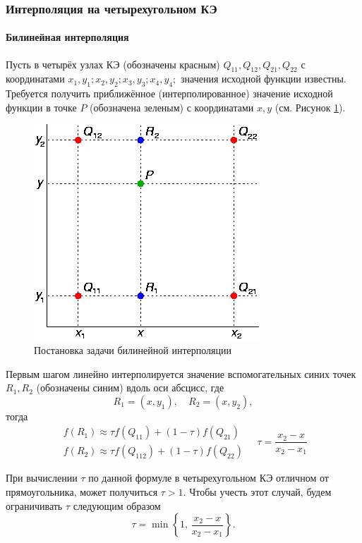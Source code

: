 \subsubsection{Интерполяция на четырехугольном КЭ}
\paragraph{Билинейная интерполяция}
Пусть в четырёх узлах КЭ (обозначены красным) $Q_{11}, Q_{12}, Q_{21}, Q_{22}$ с координатами $x_1, y_1; x_2, y_2; x_3, y_3; x_4, y_4;$ значения исходной функции известны. Требуется получить приближённое (интерполированное) значение исходной функции в точке $P$ (обозначена зеленым) с координатами $x, y$ (см. Рисунок \ref{Bilinear_interpolation}).
\begin{figure}[H]
	\centering
	\includegraphics[width=0.4\linewidth]{img/Bilinear_interpolation}
	\caption{Постановка задачи билинейной интерполяции}
	\label{Bilinear_interpolation}
\end{figure}
Первым шагом линейно интерполируется значение вспомогательных синих точек $R_1, R_2$ (обозначены синим) вдоль оси абсцисс, где
\begin{equation*}
	R_1 = (x,y_1),\quad R_2 = (x,y_2),
\end{equation*}
тогда
\begin{equation*}
	\begin{array}{cc}
		f(R_1)\approx \tau f(Q_{11}) + (1-\tau)f(Q_{21})\\
		f(R_2)\approx \tau f(Q_{112}) + (1-\tau)f(Q_{22})
	\end{array}\quad
	\tau = \frac{x_2-x}{x_2-x_1}
\end{equation*}

При вычислении $\tau$ по данной формуле в четырехугольном КЭ отличном от прямоугольника, может получиться $\tau>1$. Чтобы учесть этот случай, будем ограничивать $\tau$ следующим образом
\begin{equation*}
	\tau = \min\left\{1,\, \frac{x_2-x}{x_2-x_1}\right\}.
\end{equation*}

